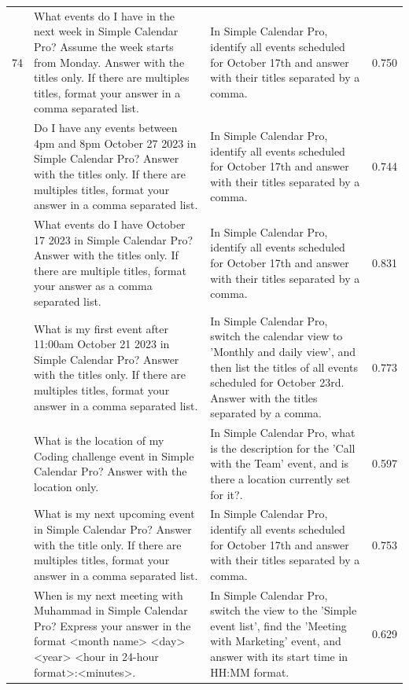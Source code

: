 \documentclass{article} %
\begin{document}
\begin{scriptsize}
\begin{longtable}{@{} c >{\raggedright\arraybackslash}p{} >{\raggedright\arraybackslash}p{} c @{}}
74 & What events do I have in the next week in Simple Calendar Pro? Assume the week starts from Monday. Answer with the titles only. If there are multiples titles, format your answer in a comma separated list. & In Simple Calendar Pro, identify all events scheduled for October 17th and answer with their titles separated by a comma. & 0.750 \\
\addlinespace[2pt]
75 & Do I have any events between 4pm and 8pm October 27 2023 in Simple Calendar Pro? Answer with the titles only. If there are multiples titles, format your answer in a comma separated list. & In Simple Calendar Pro, identify all events scheduled for October 17th and answer with their titles separated by a comma. & 0.744 \\
\addlinespace[2pt]
76 & What events do I have October 17 2023 in Simple Calendar Pro? Answer with the titles only. If there are multiple titles, format your answer as a comma separated list. & In Simple Calendar Pro, identify all events scheduled for October 17th and answer with their titles separated by a comma. & 0.831 \\
\addlinespace[2pt]
77 & What is my first event after 11:00am October 21 2023 in Simple Calendar Pro? Answer with the titles only. If there are multiples titles, format your answer in a comma separated list. & In Simple Calendar Pro, switch the calendar view to 'Monthly and daily view', and then list the titles of all events scheduled for October 23rd. Answer with the titles separated by a comma. & 0.773 \\
\addlinespace[2pt]
78 & What is the location of my Coding challenge event in Simple Calendar Pro? Answer with the location only. & In Simple Calendar Pro, what is the description for the 'Call with the Team' event, and is there a location currently set for it?. & 0.597 \\
\addlinespace[2pt]
79 & What is my next upcoming event in Simple Calendar Pro? Answer with the title only. If there are multiples titles, format your answer in a comma separated list. & In Simple Calendar Pro, identify all events scheduled for October 17th and answer with their titles separated by a comma. & 0.753 \\
\addlinespace[2pt]
80 & When is my next meeting with Muhammad in Simple Calendar Pro? Express your answer in the format <month name> <day> <year> <hour in 24-hour format>:<minutes>. & In Simple Calendar Pro, switch the view to the 'Simple event list', find the 'Meeting with Marketing' event, and answer with its start time in HH:MM format. & 0.629 \\

\end{longtable}
\end{scriptsize}
\end{document}
